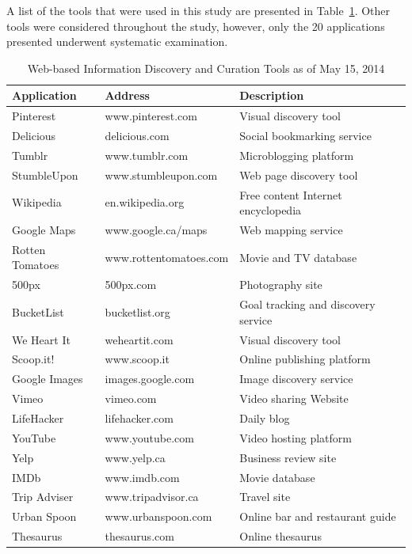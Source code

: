 \documentclass{sigchi}
\begin{document}
{A list of the tools that were used in this study are presented in Table~\ref{table:tools}. Other tools were considered throughout the study, however, only the 20 applications presented underwent systematic examination. 

\begin{table}[htbp]
\small

\label{table:tools} 

\begin{tabular}{|p{}| p{}| p{}|}

\hline
\textbf{Application} & \textbf{Address} & \textbf{Description}
\\
\hline
Pinterest       & www.pinterest.com 	& Visual discovery tool \\
\hline
Delicious       & delicious.com 		& Social bookmarking service \\
\hline
Tumblr          & www.tumblr.com 		& Microblogging platform \\
\hline
StumbleUpon     & www.stumbleupon.com  	& Web page discovery tool \\
\hline
Wikipedia       & en.wikipedia.org   	& Free content Internet encyclopedia\\
\hline
Google Maps     & www.google.ca/maps  	& Web mapping service\\
\hline
Rotten Tomatoes & www.rottentomatoes.com & Movie and TV database\\
\hline
500px           & 500px.com            	& Photography site\\
\hline
BucketList      & bucketlist.org  		& Goal tracking and discovery service\\
\hline
We Heart It     & weheartit.com 		& Visual discovery tool \\
\hline
Scoop.it!       & www.scoop.it 			& Online publishing platform \\
\hline
Google Images   & images.google.com  	& Image discovery service \\
\hline
Vimeo           & vimeo.com  			& Video sharing Website\\
\hline
LifeHacker      & lifehacker.com        & Daily blog \\
\hline
YouTube         & www.youtube.com 		& Video hosting platform \\
\hline
Yelp            & www.yelp.ca  			& Business review site\\
\hline
IMDb            & www.imdb.com  		& Movie database \\
\hline
Trip Adviser    & www.tripadvisor.ca 	& Travel site \\
\hline
Urban Spoon     & www.urbanspoon.com    & Online bar and restaurant guide\\
\hline
Thesaurus       & thesaurus.com         & Online thesaurus \\
\hline
\end{tabular}
\caption{Web-based Information Discovery and Curation Tools as of May 15, 2014}
\end{table}
} %
\end{document}
